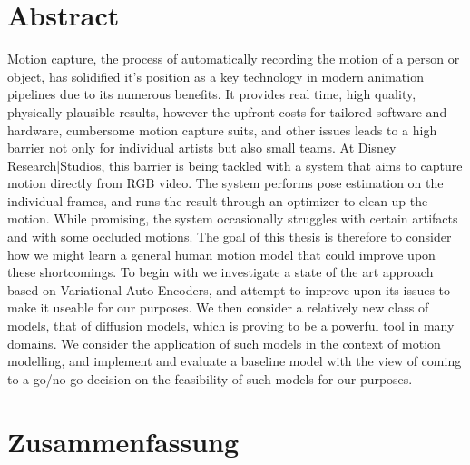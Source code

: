 \chapter*{Abstract}

Motion capture, the process of automatically recording the motion of a person or object, has solidified it's position as a key technology in modern animation pipelines due to its numerous benefits. It provides real time, high quality, physically plausible results, however the upfront costs for tailored software and hardware, cumbersome motion capture suits, and other issues leads to a high barrier not only for individual artists but also small teams. At Disney Research|Studios, this barrier is being tackled with a system that aims to capture motion directly from RGB video. The system performs pose estimation on the individual frames, and runs the result through an optimizer to clean up the motion. While promising, the system occasionally struggles with certain artifacts and with some occluded motions. The goal of this thesis is therefore to consider how we might learn a general human motion model that could improve upon these shortcomings. To begin with we investigate a state of the art approach based on Variational Auto Encoders, and attempt to improve upon its issues to make it useable for our purposes. We then consider a relatively new class of models, that of diffusion models, which is proving to be a powerful tool in many domains. We consider the application of such models in the context of motion modelling, and implement and evaluate a baseline model with the view of coming to a go/no-go decision on the feasibility of such models for our purposes.
 
\cleardoublepage
\chapter*{Zusammenfassung}


